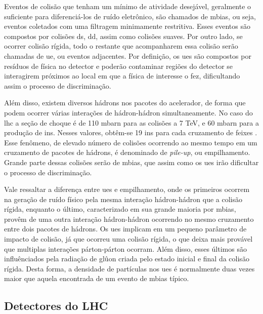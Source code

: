 
Eventos de colisão que tenham um mínimo de atividade desejável,
geralmente o suficiente para diferenciá-los de ruído eletrônico, 
são chamados de \gls{mbias}, ou
seja, eventos coletados com uma filtragem minimamente restritiva. Esses
eventos são compostos por colisões \gls{ds}, \gls{dd}, assim como colisões
suaves. Por outro lado, se ocorrer colisão rígida, 
todo o restante que acompanharem essa
colisão serão chamadas de \gls{ue}, ou eventos adjacentes.
Por definição, os \glspl{ue} são compostos por resíduos de física no
detector e poderão contaminar regiões do detector se interagirem próximos 
ao local em que a física de interesse o fez, dificultando assim o
processo de discriminação.

Além disso, existem diversos hádrons nos pacotes do acelerador, de forma que podem
ocorrer várias interações de hádron-hádron simultaneamente. No caso do \gls{lhc} 
a seção de choque é de 110 mbarn para as colisões a 7 TeV, e
60 mbarn para a produção de \glspl{in}.
Nesses valores, obtêm-se 19 \glspl{in} para cada
cruzamento de feixes \cite{webLHC,ATLAS_TDR}. Esse fenômeno, de elevado número de
colisões ocorrendo ao mesmo tempo em um cruzamento de pacotes de hádrons, é
denominado de \emph{pile-up}, ou empilhamento. Grande parte dessas colisões 
serão de \gls{mbias}, que assim como os \glspl{ue} irão
dificultar o processo de discriminação.

Vale ressaltar a diferença entre \glspl{ue}
e empilhamento, onde os primeiros ocorrem na geração de ruído físico
pela mesma interação hádron-hádron que a colisão rígida, enquanto o
último, caracterizado em sua grande maioria por \gls{mbias}, 
provêm de uma outra interação hádron-hádron ocorrendo no mesmo cruzamento entre dois 
pacotes de hádrons. Os \glspl{ue} implicam em um pequeno parâmetro de
impacto de colisão, já que ocorreu uma colisão rígida, o que deixa mais 
provável que multiplas interações párton-párton ocorram. 
Além disso, esses últimos são influênciados pela
radiação de glûon criada pelo estado inicial e final da colisão rígida. Desta
forma, a densidade de partículas nos \glspl{ue} é normalmente duas vezes
maior que aquela encontrada de um evento de \gls{mbias} típico.


\subsection{Detectores do LHC}
\label{ssec:lhc_detectores}

